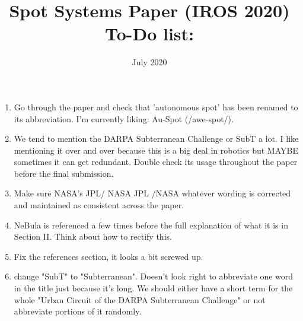\documentclass{article}
\title{Spot Systems Paper (IROS 2020) To-Do list:}
\author{}
\date{July 2020}
\begin{document}
\maketitle
\begin{enumerate}
  \item Go through the paper and check that 'autonomous spot' has been renamed to its abbreviation. I'm currently liking: Au-Spot (/awe-spot/).
  \item We tend to mention the DARPA Subterranean Challenge or SubT a lot. I like mentioning it over and over because this is a big deal in robotics but MAYBE sometimes it can get redundant. Double check its usage throughout the paper before the final submission.
  \item Make sure NASA's JPL/ NASA JPL /NASA whatever wording is corrected and maintained as consistent across the paper.
  \item NeBula is referenced a few times before the full explanation of what it is in Section II. Think about how to rectify this. 
  \item Fix the references section, it looks a bit screwed up.
  \item change "SubT" to "Subterranean". Doesn't look right to abbreviate one word in the title just because it's long. We should either have a short term for the whole "Urban Circuit of the DARPA Subterranean Challenge" or not abbreviate portions of it randomly.
\end{enumerate}


















\end{document}

